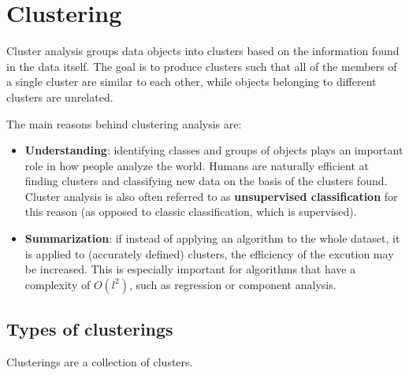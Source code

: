 \chapter{Clustering}

Cluster analysis groups data objects into clusters based on the information found in the data itself. The goal is to produce clusters such that all of the members of a single cluster are similar to each other, while objects belonging to different clusters are unrelated.

The main reasons behind clustering analysis are:

\begin{itemize}
    \item \textbf{Understanding}: identifying classes and groups of objects plays an important role in how people analyze the world. Humans are naturally efficient at finding clusters and classifying new data on the basis of the clusters found. Cluster analysis is also often referred to as \textbf{unsupervised classification} for this reason (as opposed to classic classification, which is supervised).

    \item \textbf{Summarization}: if instead of applying an algorithm to the whole dataset, it is applied to (accurately defined) clusters, the efficiency of the excution may be increased. This is especially important for algorithms that have a complexity of $O(l^2)$, such as regression or component analysis.
\end{itemize}

\section{Types of clusterings}

Clusterings are a collection of clusters.

